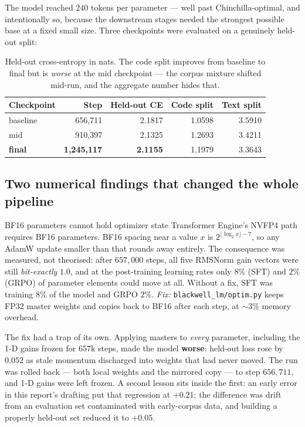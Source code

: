 \documentclass[10pt,a4paper]{article}
\newcommand{\code}[1]{\texttt{\small #1}}
\begin{document}
\noindent The model reached $240$ tokens per parameter --- well past
Chinchilla-optimal, and intentionally so, because the downstream stages needed
the strongest possible base at a fixed small size. Three checkpoints were
evaluated on a genuinely held-out split:

\begin{table}[h]
\centering\small
\begin{tabular}{@{}lrrrr@{}}
\toprule
\textbf{Checkpoint} & \textbf{Step} & \textbf{Held-out CE} & \textbf{Code split} & \textbf{Text split} \\
\midrule
baseline & 656{,}711 & 2.1817 & 1.0598 & 3.5910 \\
mid & 910{,}397 & 2.1325 & 1.2693 & 3.4211 \\
\textbf{final} & \textbf{1{,}245{,}117} & \textbf{2.1155} & 1.1979 & 3.3643 \\
\bottomrule
\end{tabular}
\caption{Held-out cross-entropy in nats. The code split improves from baseline
to final but is \emph{worse} at the mid checkpoint --- the corpus mixture
shifted mid-run, and the aggregate number hides that.}
\end{table}

\subsection{Two numerical findings that changed the whole pipeline}

\begin{finding}{BF16 parameters cannot hold optimizer state}
Transformer Engine's NVFP4 path requires BF16 parameters. BF16 spacing near a
value $x$ is $2^{\lfloor \log_2 x \rfloor - 7}$, so any AdamW update smaller
than that rounds away entirely. The consequence was measured, not theorised:
after $657{,}000$ steps, all five RMSNorm gain vectors were still
\emph{bit-exactly} $1.0$, and at the post-training learning rates only $8\%$
(SFT) and $2\%$ (GRPO) of parameter elements could move at all. Without a
fix, SFT was training $8\%$ of the model and GRPO $2\%$.
\emph{Fix:} \code{blackwell\_lm/optim.py} keeps FP32 master weights and copies
back to BF16 after each step, at ${\sim}3\%$ memory overhead.
\end{finding}

\noindent The fix had a trap of its own. Applying masters to \emph{every}
parameter, including the 1-D gains frozen for $657\text{k}$ steps, made the
model \textbf{worse}: held-out loss rose by $0.052$ as stale momentum
discharged into weights that had never moved. The run was rolled back --- both
local weights and the mirrored copy --- to step $656{,}711$, and 1-D gains were left
frozen. A second lesson sits inside the first: an early error in this report's
drafting put that regression at $+0.21$; the difference was drift from an
evaluation set contaminated with early-corpus data, and building a properly
held-out set reduced it to $+0.05$.
\end{document}
